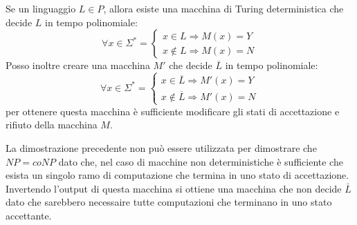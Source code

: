 \begin{dimostrazione}
    Se un linguaggio $L \in P$, allora esiste una macchina di Turing
    deterministica che decide $L$ in tempo polinomiale:
    \begin{equation}
        \forall x \in \Sigma^{\ast} = \begin{cases}
            x \in L \Rightarrow M(x) = Y \\
            x \not\in L \Rightarrow M(x) = N
        \end{cases}
    \end{equation}
    Posso inoltre creare una macchina $M'$ che decide $\overline{L}$ in tempo
    polinomiale:
    \begin{equation}
        \forall x \in \Sigma^{\ast} = \begin{cases}
            x \in \overline{L} \Rightarrow M'(x) = Y \\
            x \not\in \overline{L} \Rightarrow M'(x) = N
        \end{cases}
    \end{equation}
    per ottenere questa macchina è sufficiente modificare gli stati di
    accettazione e rifiuto della macchina $M$.
\end{dimostrazione}
La dimostrazione precedente non può essere utilizzata per dimostrare che $NP =
    coNP$ dato che, nel caso di macchine non deterministiche è sufficiente che
esista un singolo ramo di computazione che termina in uno stato di accettazione.
Invertendo l'output di questa macchina si ottiene una macchina che non decide
$\bar{L}$ dato che sarebbero necessaire tutte computazioni che terminano in uno
stato accettante.

